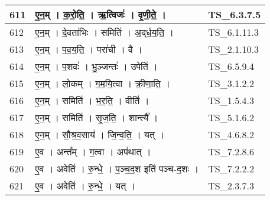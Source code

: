 \documentclass[17pt]{extarticle}
\begin{document}
\begin{longtable}{||p{0.4in}||p{4.9in}||p{0.9in}||}
    \hline
        
    611 & ए॒न॒म्   ।   क॒रो॒ति॒   ।   ऋ॒त्विजः॑   ।   वृ॒णी॒ते॒   ।    & TS\_6.3.7.5       \\
    
    \hline
        
    612 & ए॒न॒म्   ।   दे॒वता॑भिः   ।   समिति॑   ।   अ॒द्‌र्ध॒य॒ति॒   ।    & TS\_6.1.11.3       \\
    
    \hline
        
    613 & ए॒न॒म्   ।   प॒व॒य॒ति॒   ।   परा॑ची   ।   वै   ।    & TS\_2.1.10.3       \\
    
    \hline
        
    614 & ए॒न॒म्   ।   प॒शवः॑   ।   भु॒ञ्जन्तः॑   ।   उपेति॑   ।    & TS\_6.5.9.4       \\
    
    \hline
        
    615 & ए॒न॒म्   ।   लो॒कम्   ।   ग॒म॒यि॒त्वा   ।   क्री॒णा॒ति॒   ।    & TS\_3.1.2.2       \\
    
    \hline
        
    616 & ए॒न॒म्   ।   समिति॑   ।   भ॒र॒ति॒   ।   वीति॑   ।    & TS\_1.5.4.3       \\
    
    \hline
        
    617 & ए॒न॒म्   ।   समिति॑   ।   सृ॒ज॒ति॒   ।   शान्त्यै᳚   ।    & TS\_5.1.6.2       \\
    
    \hline
        
    618 & ए॒न॒म्   ।   सौ॒श्र॒व॒साय॑   ।   जि॒न्व॒ति॒   ।   यत्   ।    & TS\_4.6.8.2       \\
    
    \hline
        
    619 & ए॒व   ।   अन्त᳚म्   ।   ग॒त्वा   ।   अप॑थात्   ।    & TS\_7.2.8.6       \\
    
    \hline
        
    620 & ए॒व   ।   अवेति॑   ।   रु॒न्धे॒   ।   प॒ञ्च॒द॒श इति॑ पञ्च{-}द॒शः   ।    & TS\_7.2.2.2       \\
    
    \hline
        
    621 & ए॒व   ।   अवेति॑   ।   रु॒न्धे॒   ।   यत्   ।    & TS\_2.3.7.3       \\
    

\end{longtable}
\end{document}
